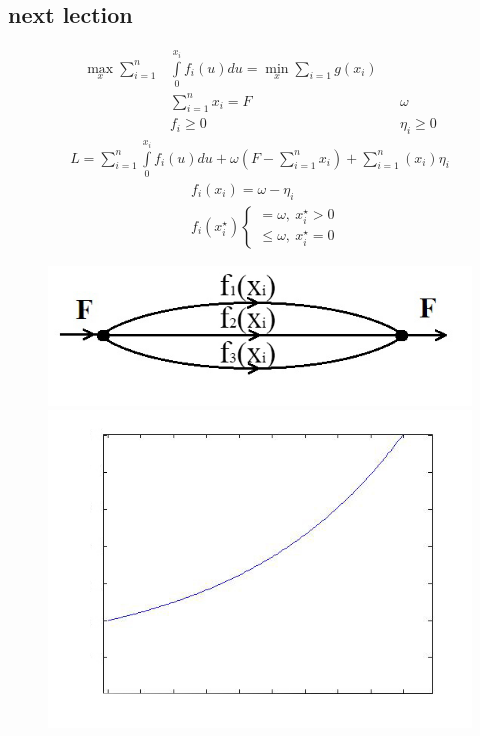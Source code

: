 \documentclass[12pt,a4paper,titlepage,oneside]{book}
\theoremstyle{definition}
\theoremstyle{plain}
\theoremstyle{remark}
\theoremstyle{remark}
\theoremstyle{plain}
\theoremstyle{plain}
\begin{document}
\subsection{next lection}
\begin{align*}
\max\limits_x \sum \limits_{i=1}^n &\int \limits_0^{x_i} f_i(u)du = \min \limits_x \sum \limits_{i=1}g(x_i)\\
&\sum\limits_{i=1}^n x_i = F &&\omega\\
&f_i \geq 0 &&\eta_i \geq 0
\end{align*}
\begin{align*}
L = \sum\limits_{i=1}^n \int \limits_0^{x_i} f_i(u)du + \omega(F - \sum\limits_{i=1}^n x_i) + \sum\limits_{i=1}^n (x_i)\eta_i
\end{align*}
\begin{align*}
&f_i(x_i) = \omega - \eta_i \\
&f_i(x_i^\star)  \begin{cases} = \omega, \: x_i^\star > 0\\
\leq \omega, \: x_i^\star = 0
\end{cases}
\end{align*}
\begin{figure}[h]
	\centering
	\begin{minipage}{0.43\linewidth}
	\includegraphics[width=1\linewidth]{img21.jpg}
	\caption{} \label{img:img2.1}
	\end{minipage}
	\begin{minipage}{0.43\linewidth}
	\includegraphics[width=1\linewidth]{img22.jpg}
	\caption{} \label{img:img2.2}
	\end{minipage}
\end{figure} \\
\end{document}
